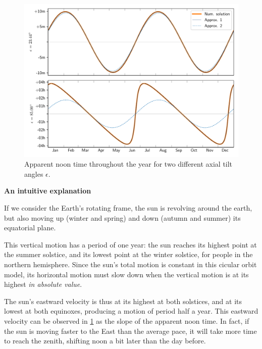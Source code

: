 \documentclass[12pt]{article}
\begin{document}
\begin{figure}[ht]
    \centering
    \includegraphics[width=\textwidth]{./figures/noon_computed_easy.pdf}
    \caption{
        Apparent noon time throughout the year for two different axial tilt angles $\epsilon$.
    }
    \label{fig:noon_shift}
\end{figure}

\textbf{An intuitive explanation}

If we consider the Earth's rotating frame,
the sun is revolving around the earth, but also moving up 
(winter and spring) and down (autumn and summer) its equatorial plane.

This vertical motion has a period of one year: the sun reaches its highest point
at the summer solstice, and its lowest point at the winter solstice, for people 
in the northern hemisphere. Since the sun's total motion is constant in this 
cicular orbit model, its horizontal motion must slow down when the vertical 
motion is at its highest \textit{in absolute value}. 

The sun's eastward velocity is thus at its highest
at both solstices, and at its lowest at both equinoxes, producing a
motion of period half a year. This eastward velocity can be observed in 
\ref{fig:noon_shift} as the slope of the apparent noon time. In fact, 
if the sun is moving faster to the East than the average pace, it will take 
more time to reach the zenith, shifting noon a bit later than the day before.


\clearpage
\end{document}
